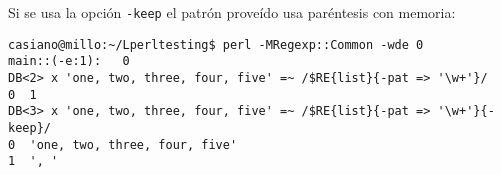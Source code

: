 Si se usa la opción \verb|-keep| el patrón proveído usa paréntesis con memoria:
\begin{verbatim}
casiano@millo:~/Lperltesting$ perl -MRegexp::Common -wde 0
main::(-e:1):   0
DB<2> x 'one, two, three, four, five' =~ /$RE{list}{-pat => '\w+'}/
0  1
DB<3> x 'one, two, three, four, five' =~ /$RE{list}{-pat => '\w+'}{-keep}/
0  'one, two, three, four, five'
1  ', '
\end{verbatim}
%
%
%

